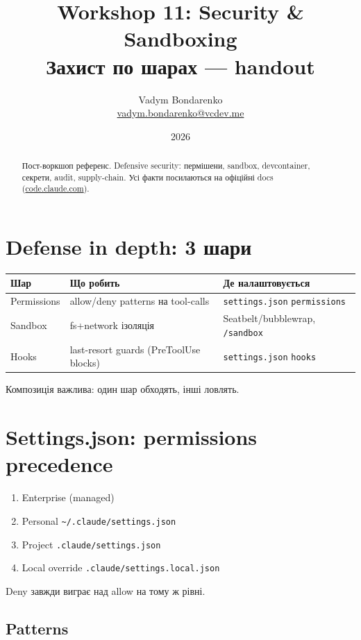 \documentclass[11pt,a4paper]{article}
\title{%
  {\Huge\bfseries Workshop 11: Security \& Sandboxing}\\[0.6em]
  {\large Захист по шарах --- handout}
}
\author{Vadym Bondarenko \\ \small\href{mailto:vadym.bondarenko@vcdev.me}{vadym.bondarenko@vcdev.me}}
\date{2026}
\begin{document}
\maketitle

\begin{abstract}
Пост-воркшоп референс. Defensive security: пермішени, sandbox, devcontainer, секрети, audit, supply-chain. Усі факти посилаються на офіційні docs (\href{https://code.claude.com/docs/en/security}{code.claude.com}).
\end{abstract}

\tableofcontents
\newpage

\section{Defense in depth: 3 шари}

\begin{tabular}{lll}
\hline
\textbf{Шар} & \textbf{Що робить} & \textbf{Де налаштовується} \\
\hline
Permissions & allow/deny patterns на tool-calls & \texttt{settings.json} \texttt{permissions} \\
Sandbox & fs+network ізоляція & Seatbelt/bubblewrap, \texttt{/sandbox} \\
Hooks & last-resort guards (PreToolUse blocks) & \texttt{settings.json} \texttt{hooks} \\
\hline
\end{tabular}

Композиція важлива: один шар обходять, інші ловлять.

\section{Settings.json: permissions precedence}

\begin{enumerate}
\item Enterprise (managed)
\item Personal \texttt{\textasciitilde/.claude/settings.json}
\item Project \texttt{.claude/settings.json}
\item Local override \texttt{.claude/settings.local.json}
\end{enumerate}

Deny завжди виграє над allow на тому ж рівні.

\subsection{Patterns}
\end{document}
